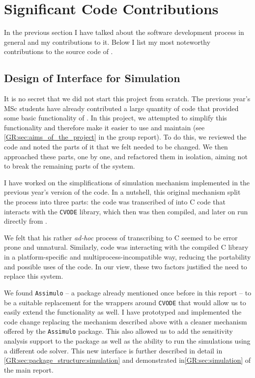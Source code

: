 \section{Significant Code Contributions}

In the previous section I have talked about the software development process in general and my contributions to it. 
Below I list my most noteworthy contributions to the source code of \means{}.

\subsection{Design of Interface for Simulation}
\label{sec:simulation}

It is no secret that we did not start this project from scratch.
The previous year's MSc students have already contributed a large quantity of \py{} code that provided some basic functionality of \means{}. In this project, we attempted to simplify this functionality and therefore make it easier to use and maintain (see \autoref*{GR:sec:aims_of_the_project} in the group report).
To do this, we reviewed the code and noted the parts of it that we felt needed to be changed. 
We then approached these parts, one by one, and refactored them in isolation, aiming not to break the remaining parts of the system.

I have worked on the simplifications of simulation mechanism implemented in the previous year's version of the code. 
In a nutshell, this original mechanism split the process into three parts: the \python{} code was transcribed of into C code that interacts with the \verb"CVODE" library\cite{hindmarsh_sundials_2005}, which then was then compiled, and later on run directly from \py{}.

We felt that his rather \emph{ad-hoc} process of transcribing \py{} to C seemed to be error prone and unnatural. 
Similarly, \py{} code was interacting with the compiled C library in a platform-specific and multiprocess-incompatible way, reducing the portability and possible uses of the code. In our view, these two factors justified the need to replace this system.

We found \verb"Assimulo" -- a package already mentioned once before in this report -- to be a suitable replacement for the wrappers around \verb"CVODE" that would allow us to easily extend the functionality as well. 
I have prototyped and implemented the code change replacing the mechanism described above with a cleaner mechanism offered by the \verb"Assimulo" package. This also allowed us to add the sensitivity analysis support to the \means{} package as well as the ability to run the simulations using a different \gls{ode} solver.
This new interface is further described in detail in \autoref*{GR:sec:package_structure:simulation} and demonstrated in\autoref*{GR:sec:simulation} of the main report.

